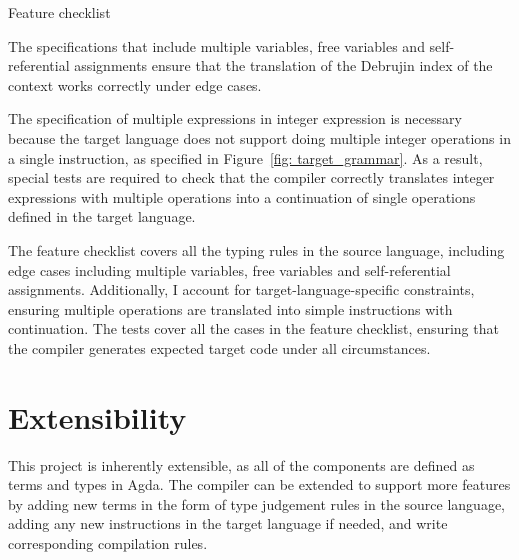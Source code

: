 \documentclass[12pt,a4paper]{report}
\theoremstyle{definition}
\begin{document}
\begin{table}[H]
        \caption{Feature checklist}
        \label{tab: feature_checklist}
    \end{table}

    The specifications that include multiple variables, free variables and self-referential assignments ensure that the translation of the Debrujin index of the context works correctly under edge cases.

    The specification of multiple expressions in integer expression is necessary because the target language does not support doing multiple integer operations in a single instruction, as specified in Figure~\ref{fig: target_grammar}. As a result, special tests are required to check that the compiler correctly translates integer expressions with multiple operations into a continuation of single operations defined in the target language. 

    The feature checklist covers all the typing rules in the source language, including edge cases including multiple variables, free variables and self-referential assignments. Additionally, I account for target-language-specific constraints, ensuring multiple operations are translated into simple instructions with continuation. The tests cover all the cases in the feature checklist, ensuring that the compiler generates expected target code under all circumstances.

    \section{Extensibility}
    This project is inherently extensible, as all of the components are defined as terms and types in Agda. The compiler can be extended to support more features by adding new terms in the form of type judgement rules in the source language, adding any new instructions in the target language if needed, and write corresponding compilation rules.
\end{document}
